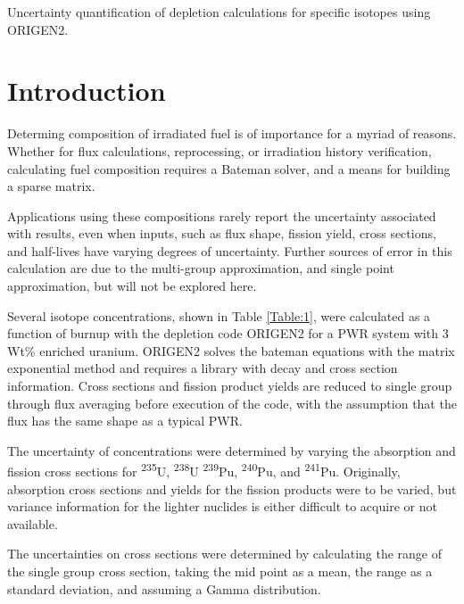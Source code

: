 \documentclass[11pt,notitlepage]{article}
\newcommand{\tss}{\textsuperscript}
\newcommand\tab[1][0.6cm]{\hspace*{#1}}
\begin{document}
\vspace*{0.5cm}


\vspace{1cm}
Uncertainty quantification of depletion calculations
for specific isotopes using ORIGEN2.

 
\section{Introduction}

\tab
Determing composition of irradiated fuel is of importance
for a myriad of reasons. Whether for flux calculations,
reprocessing, or irradiation history verification,
calculating fuel composition requires a Bateman solver,
and a means for building a sparse matrix.

Applications using these compositions rarely report the
uncertainty associated with results, even when inputs,
such as flux shape, fission yield, cross sections,
and half-lives have varying degrees of uncertainty. Further
sources of error in this calculation are due to the multi-group
approximation, and single point approximation,
but will not be explored here.

Several isotope concentrations, shown in Table \ref{Table:1},
were calculated as a function of burnup
with the depletion code ORIGEN2 for a PWR system with 3 Wt\%
enriched uranium. ORIGEN2 solves the bateman equations with
the matrix exponential method and requires a library
with decay and cross section information. Cross sections and
fission product yields are reduced to single group through flux
averaging before execution of the code,
with the assumption that the flux has the same shape as a typical PWR.

The uncertainty of concentrations were determined by varying the
absorption and fission cross sections for \tss{235}U, \tss{238}U
\tss{239}Pu, \tss{240}Pu, and \tss{241}Pu. Originally, absorption
cross sections and yields for the fission products were to be
varied, but
variance information for the lighter nuclides is either
difficult to acquire or not available.

The uncertainties on cross sections
were determined by calculating the range of the single group
cross section, taking the mid point as a mean, the range as
a standard deviation, and assuming a Gamma distribution.
\end{document}
